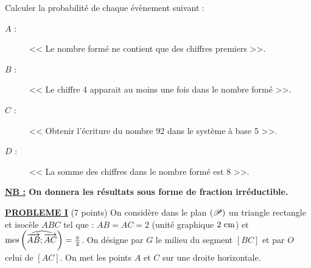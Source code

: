 \begin{enumerate}
                  Calculer la probabilit\'e de chaque \'ev\`enement suivant :
                        \begin{description}
                              \item[$A$ :] << Le nombre form\'e ne contient que des chiffres premiers >>.
                              \item[$B$ :] << Le chiffre 4 apparait au moins une fois dans le nombre form\'e >>.
                              \item[$C$ :] << Obtenir l'\'ecriture du nombre 92 dans le syst\`eme \`a base 5 >>.
                              \item[$D$ :] << La somme des chiffres dans le nombre form\'e est 8 >>.
                        \end{description}
                        \begin{center}
                              \textbf{\underline{NB :} On donnera les r\'esultats sous forme de fraction irr\'eductible.}
                        \end{center}
      \end{enumerate}
\noindent \underline{\textsc{\textbf{PROBLEME I}}} (7 points) \newline
%
      On consid\`ere dans le plan $(\mathscr{P})$ un triangle rectangle et isoc\`ele $ABC$ tel que : 
      $AB = AC = 2$ (unit\'e graphique $2~\mathrm{cm}$) et $\mathrm{mes}\left( \widehat{ \overrightarrow{AB} ; \overrightarrow{AC} } \right) = \frac{\pi}{2}$.
      On d\'esigne par $G$ le milieu du segment $[BC]$ et par $O$ celui de $[AC]$.
      On met les points $A$ et $C$ sur une droite horizontale.
      
